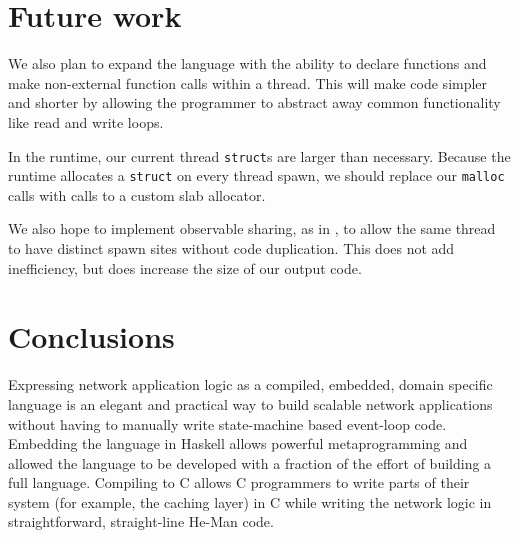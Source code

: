 \documentclass[preprint,10pt]{sigplanconf}
\renewcommand{\t}{\texttt}
\begin{document}


\section{Future work}

We also plan to expand the language with the ability to declare functions and
make non-external function calls within a thread. This will make code simpler
and shorter by allowing the programmer to abstract away common functionality
like read and write loops.

In the runtime, our current thread \t{struct}s are larger than necessary.
Because the runtime allocates a \t{struct} on every thread spawn, we should
replace our \t{malloc} calls with calls to a custom slab allocator.

We also hope to implement observable sharing, as in \cite{Gill}, to allow the
same thread to have distinct spawn sites without code duplication. This does not
add inefficiency, but does increase the size of our output code. 

\section{Conclusions}
Expressing network application logic as a compiled, embedded, domain
specific language is an elegant and practical way to build scalable
network applications without having to manually write state-machine
based event-loop code. Embedding the language in Haskell allows
powerful metaprogramming and allowed the language to be developed with
a fraction of the effort of building a full language. Compiling to C
allows C programmers to write parts of their system (for example, the
caching layer) in C while writing the network logic in
straightforward, straight-line He-Man code.


{}

\end{document}
